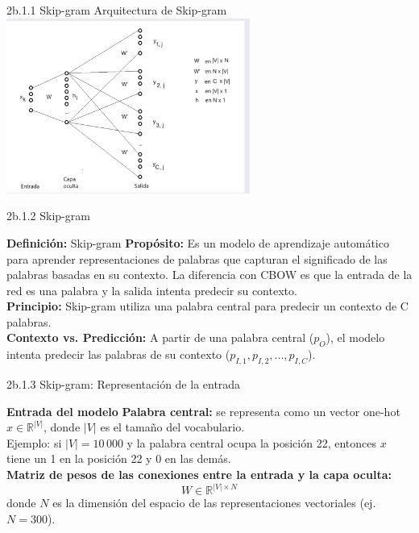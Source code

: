 \documentclass{beamer}
\begin{document}
\begin{frame}[fragile]{2b.1.1 Skip-gram}
	\centering
	\Large Arquitectura de Skip-gram
	\vspace{0.5cm} 
	\vfill
	\includegraphics[width=0.6\textwidth]{Skip_arq.png}
	\vfill
\end{frame}

\begin{frame}[fragile]{2b.1.2 Skip-gram}
	\begin{block}{\textbf{Definición:} Skip-gram}
		\justifying
		\vspace{0.1cm}
		\textbf{Propósito:} Es un modelo de aprendizaje automático para aprender representaciones de palabras que capturan el significado de las palabras basadas en su contexto. La diferencia con CBOW es que la entrada de la red es una palabra y la salida intenta predecir su contexto.\\
		\vspace{0.1cm}
		\textbf{Principio:} Skip-gram utiliza una palabra central para predecir un contexto de C palabras.\\
		\vspace{0.1cm}
		\textbf{Contexto vs. Predicción:} A partir de una palabra central ($p_O$), el modelo intenta predecir las palabras de su contexto ($p_{I,1}, p_{I,2}, ..., p_{I,C}$).
	\end{block}    
\end{frame}

\begin{frame}[fragile]{2b.1.3 Skip-gram: Representación de la entrada}
	\begin{block}{\textbf{Entrada del modelo}}
		\justifying
		\textbf{Palabra central:} se representa como un vector one-hot $x \in \mathbb{R}^{|V|}$, 
		donde $|V|$ es el tamaño del vocabulario.\\
		\vspace{0.2cm}
		Ejemplo: si $|V|=10\,000$ y la palabra central ocupa la posición 22, 
		entonces $x$ tiene un 1 en la posición 22 y 0 en las demás.\\
		\vspace{0.2cm}
		\textbf{Matriz de pesos de las conexiones entre la entrada y la capa oculta:} 
		\[
		W \in \mathbb{R}^{|V| \times N}
		\]
		donde $N$ es la dimensión del espacio de las representaciones vectoriales (ej. $N=300$).
	\end{block}
\end{frame}
\end{document}

